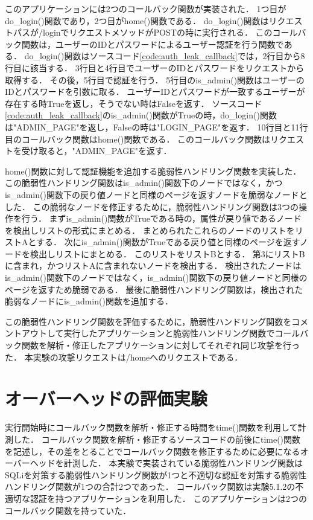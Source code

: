 \documentclass[a4paper,12pt]{jreport}
\begin{document}
このアプリケーションには2つのコールバック関数が実装された．
1つ目がdo\_login()関数であり，2つ目がhome()関数である．
do\_login()関数はリクエストパスが/loginでリクエストメソッドがPOSTの時に実行される．
このコールバック関数は，ユーザーのIDとパスワードによるユーザー認証を行う関数である．
do\_login()関数はソースコード\ref{code:auth_leak_callback}では，2行目から8行目に該当する．
3行目と4行目でユーザーのIDとパスワードをリクエストから取得する．
その後，5行目で認証を行う．
5行目のis\_admin()関数はユーザーのIDとパスワードを引数に取る．
ユーザーIDとパスワードが一致するユーザーが存在する時Trueを返し，そうでない時はFalseを返す．
ソースコード\ref{code:auth_leak_callback}のis\_admin()関数がTrueの時，do\_login()関数は"ADMIN\_PAGE"を返し，Falseの時は"LOGIN\_PAGE"を返す．
10行目と11行目のコールバック関数はhome()関数である．
このコールバック関数はリクエストを受け取ると，"ADMIN\_PAGE"を返す．

home()関数に対して認証機能を追加する脆弱性ハンドリング関数を実装した．
この脆弱性ハンドリング関数はis\_admin()関数下のノードではなく，かつis\_admin()関数下の戻り値ノードと同様のページを返すノードを脆弱なノードとした．
この脆弱なノードを修正するために，脆弱性ハンドリング関数は3つの操作を行う．
まずis\_admin()関数がTrueである時の，属性が戻り値であるノードを検出しリストの形式にまとめる．
まとめられたこれらのノードのリストをリストAとする．
次にis\_admin()関数がTrueである戻り値と同様のページを返すノードを検出しリストにまとめる．
このリストをリストBとする．
第3にリストBに含まれ，かつリストAに含まれないノードを検出する．
検出されたノードはis\_admin()関数下のノードではなく，is\_admin()関数下の戻り値ノードと同様のページを返すため脆弱である．
最後に脆弱性ハンドリング関数は，検出された脆弱なノードにis\_admin()関数を追加する．

この脆弱性ハンドリング関数を評価するために，脆弱性ハンドリング関数をコメントアウトして実行したアプリケーションと脆弱性ハンドリング関数でコールバック関数を解析・修正したアプリケーションに対してそれぞれ同じ攻撃を行った．
本実験の攻撃リクエストは/homeへのリクエストである．

\section{オーバーヘッドの評価実験}
実行開始時にコールバック関数を解析・修正する時間をtime()関数を利用して計測した．
コールバック関数を解析・修正するソースコードの前後にtime()関数を記述し，その差をとることでコールバック関数を修正するために必要になるオーバーヘッドを計測した．
本実験で実装されている脆弱性ハンドリング関数はSQLiを対策する脆弱性ハンドリング関数が1つと不適切な認証を対策する脆弱性ハンドリング関数が1つの合計2つであった．
コールバック関数は実験5.1.2の不適切な認証を持つアプリケーションを利用した．
このアプリケーションは2つのコールバック関数を持っていた．
\end{document}
